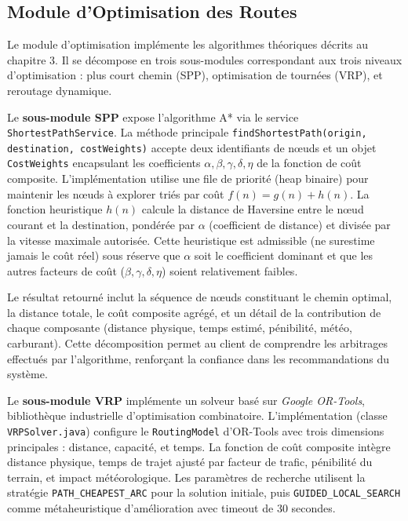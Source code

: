 \subsection{Module d'Optimisation des Routes}

Le module d'optimisation implémente les algorithmes théoriques décrits au chapitre 3. Il se décompose en trois sous-modules correspondant aux trois niveaux d'optimisation : plus court chemin (SPP), optimisation de tournées (VRP), et reroutage dynamique.

Le \textbf{sous-module SPP} expose l'algorithme A* via le service \texttt{ShortestPathService}. La méthode principale \texttt{findShortestPath(origin, destination, costWeights)} accepte deux identifiants de nœuds et un objet \texttt{CostWeights} encapsulant les coefficients $\alpha, \beta, \gamma, \delta, \eta$ de la fonction de coût composite. L'implémentation utilise une file de priorité (heap binaire) pour maintenir les nœuds à explorer triés par coût $f(n) = g(n) + h(n)$. La fonction heuristique $h(n)$ calcule la distance de Haversine entre le nœud courant et la destination, pondérée par $\alpha$ (coefficient de distance) et divisée par la vitesse maximale autorisée. Cette heuristique est admissible (ne surestime jamais le coût réel) sous réserve que $\alpha$ soit le coefficient dominant et que les autres facteurs de coût ($\beta, \gamma, \delta, \eta$) soient relativement faibles.

Le résultat retourné inclut la séquence de nœuds constituant le chemin optimal, la distance totale, le coût composite agrégé, et un détail de la contribution de chaque composante (distance physique, temps estimé, pénibilité, météo, carburant). Cette décomposition permet au client de comprendre les arbitrages effectués par l'algorithme, renforçant la confiance dans les recommandations du système.

Le \textbf{sous-module VRP} implémente un solveur basé sur \textit{Google OR-Tools}, bibliothèque industrielle d'optimisation combinatoire. L'implémentation (classe \texttt{VRPSolver.java}) configure le \texttt{RoutingModel} d'OR-Tools avec trois dimensions principales : distance, capacité, et temps. La fonction de coût composite intègre distance physique, temps de trajet ajusté par facteur de trafic, pénibilité du terrain, et impact météorologique. Les paramètres de recherche utilisent la stratégie \texttt{PATH\_CHEAPEST\_ARC} pour la solution initiale, puis \texttt{GUIDED\_LOCAL\_SEARCH} comme métaheuristique d'amélioration avec timeout de 30 secondes.

